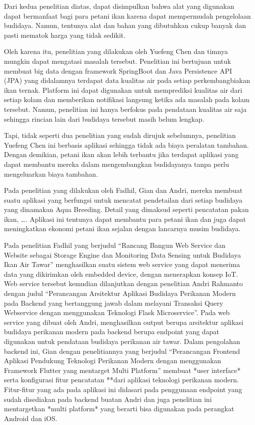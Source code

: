 Dari kedua penelitian diatas, dapat disimpulkan bahwa alat yang digunakan dapat bermanfaat bagi para petani ikan karena dapat mempermudah pengelolaan budidaya. Namun, tentunya alat dan bahan yang dibutuhkan cukup banyak dan pasti mematok harga yang tidak sedikit. 

Oleh karena itu, penelitian yang dilakukan oleh Yuefeng Chen dan timnya mungkin dapat mengatasi masalah tersebut. Penelitian ini bertujuan untuk membuat big data dengan framework SpringBoot dan Java Persistence API (JPA) yang didalamnya terdapat data kualitas air pada setiap perkembangbiakan ikan ternak. Platform ini dapat digunakan untuk memprediksi kualitas air dari setiap kolam dan memberikan notifikasi langsung ketika ada masalah pada kolam tersebut. Namun, penelitian ini hanya berfokus pada pendataan kualitas air saja sehingga rincian lain dari budidaya tersebut masih belum lengkap.

Tapi, tidak seperti dua penelitian yang sudah dirujuk sebelumnya, penelitian Yuefeng Chen ini berbasis aplikasi sehingga tidak ada biaya peralatan tambahan. Dengan demikian, petani ikan akan lebih terbantu jika terdapat aplikasi yang dapat membantu mereka dalam mengembangkan budidayanya tanpa perlu mengeluarkan biaya tambahan.

Pada penelitian yang dilakukan oleh Fadhil, Gian dan Andri, mereka membuat suatu aplikasi yang berfungsi untuk mencatat pendetailan dari setiap budidaya yang dinamakan Aqua Breeding. Detail yang dimaksud seperti pencatatan pakan ikan, …. Aplikasi ini tentunya dapat membantu para petani ikan dan juga dapat meningkatkan ekonomi petani ikan sejalan dengan lancarnya musim budidaya.

Pada penelitian Fadhil yang berjudul “Rancang Bangun Web Service dan Website sebagai Storage Engine dan Monitoring Data Sensing untuk Budidaya Ikan Air Tawar” menghasilkan suatu sistem web service yang dapat menerima data yang dikirimkan oleh embedded device, dengan menerapkan konsep IoT. Web service tersebut kemudian dilanjutkan dengan penelitian Andri Rahmanto dengan judul “Perancangan Arsitektur Aplikasi Budidaya Perikanan Modern pada Backend yang bertanggung jawab dalam melayani Transaksi Query Webservice dengan menggunakan Teknologi Flask Microservice”. Pada web service yang dibuat oleh Andri, menghasilkan output berupa arsitektur aplikasi budidaya perikanan modern pada backend berupa endpoint yang dapat digunakan untuk pendataan budidaya perikanan air tawar. Dalam pengolahan backend ini, Gian dengan penelitiannya yang berjudul “Perancangan Frontend Aplikasi Pendukung Teknologi Perikanan Modern dengan menggunakan Framework Flutter yang mentarget Multi Platform” membuat *user interface* serta konfigurasi fitur pencatatan **dari aplikasi teknologi perikanan modern. Fitur-fitur yang ada pada aplikasi ini didasari pada penggunaan endpoint yang sudah disediakan pada backend buatan Andri dan juga penelitian ini mentargetkan *multi platform* yang berarti bisa digunakan pada perangkat Android dan iOS.

